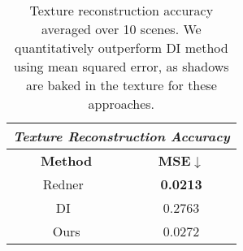 %
%
%
\begin{table}
	\begin{center}
		\begin{tabular}{|c|c|}
			\hline
			\multicolumn{2}{|c|}{\textit{Texture Reconstruction Accuracy}} \\
			\hline
			\textbf{Method}                                             & \textbf{MSE}$\downarrow$     	    \\
			\hline
			Redner~\cite{li2018differentiable}							& \textbf{0.0213}		           	\\
			DI~\cite{ravi2020pytorch3d} 			                    & 0.2763		           			\\
			\hline
			Ours    									   	            & 0.0272		  				    \\
			\hline
		\end{tabular}
	\end{center}
	\caption
	{
		Texture reconstruction accuracy averaged over 10 scenes.
		We quantitatively outperform DI method  using mean squared error, as shadows are  baked in the texture for these approaches.
	}
	\label{tab:texture}
\end{table}
%
%
%
